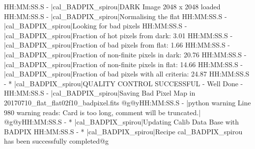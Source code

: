\begin{cmdboxprintspecial}
HH:MM:SS.S -   |cal_BADPIX_spirou|DARK Image 2048 x 2048 loaded
HH:MM:SS.S -   |cal_BADPIX_spirou|Normalising the flat
HH:MM:SS.S -   |cal_BADPIX_spirou|Looking for bad pixels
HH:MM:SS.S -   |cal_BADPIX_spirou|Fraction of hot pixels from dark: 3.01 %
HH:MM:SS.S -   |cal_BADPIX_spirou|Fraction of bad pixels from flat: 1.66 %
HH:MM:SS.S -   |cal_BADPIX_spirou|Fraction of non-finite pixels in dark: 20.76 %
HH:MM:SS.S -   |cal_BADPIX_spirou|Fraction of non-finite pixels in flat: 14.66 %
HH:MM:SS.S -   |cal_BADPIX_spirou|Fraction of bad pixels with all criteria: 24.87 %
HH:MM:SS.S - * |cal_BADPIX_spirou|QUALITY CONTROL SUCCESSFUL - Well Done -
HH:MM:SS.S -   |cal_BADPIX_spirou|Saving Bad Pixel Map in 20170710_flat_flat02f10_badpixel.fits
@g@yHH:MM:SS.S - \@ |python warning Line 980  warning reads: Card is too long, comment will be truncated.|
@g@yHH:MM:SS.S - * |cal_BADPIX_spirou|Updating Calib Data Base with BADPIX
HH:MM:SS.S - * |cal_BADPIX_spirou|Recipe cal_BADPIX_spirou has been successfully completed@g
\end{cmdboxprintspecial}
